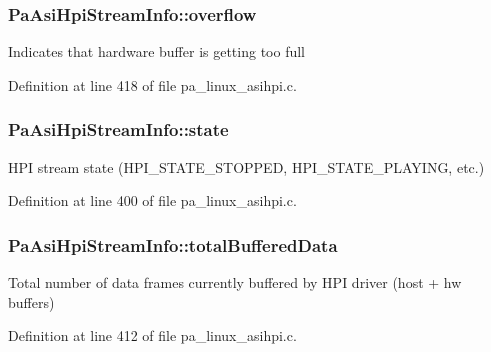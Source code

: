 \subsubsection[{\texorpdfstring{overflow}{overflow}}]{ Pa\+Asi\+Hpi\+Stream\+Info\+::overflow}\hypertarget{struct_pa_asi_hpi_stream_info_aab85a5b0d14b9f58ada42c0043a6f7f9}{}\label{struct_pa_asi_hpi_stream_info_aab85a5b0d14b9f58ada42c0043a6f7f9}
Indicates that hardware buffer is getting too full 

Definition at line 418 of file pa\+\_\+linux\+\_\+asihpi.\+c.

\subsubsection[{\texorpdfstring{state}{state}}]{ Pa\+Asi\+Hpi\+Stream\+Info\+::state}\hypertarget{struct_pa_asi_hpi_stream_info_ab9516c3e7be528304c1829cb086c0ba5}{}\label{struct_pa_asi_hpi_stream_info_ab9516c3e7be528304c1829cb086c0ba5}
H\+PI stream state (H\+P\+I\+\_\+\+S\+T\+A\+T\+E\+\_\+\+S\+T\+O\+P\+P\+ED, H\+P\+I\+\_\+\+S\+T\+A\+T\+E\+\_\+\+P\+L\+A\+Y\+I\+NG, etc.) 

Definition at line 400 of file pa\+\_\+linux\+\_\+asihpi.\+c.

\subsubsection[{\texorpdfstring{total\+Buffered\+Data}{totalBufferedData}}]{ Pa\+Asi\+Hpi\+Stream\+Info\+::total\+Buffered\+Data}\hypertarget{struct_pa_asi_hpi_stream_info_a573171e6d7e38fa204f0827638a09d1d}{}\label{struct_pa_asi_hpi_stream_info_a573171e6d7e38fa204f0827638a09d1d}
Total number of data frames currently buffered by H\+PI driver (host + hw buffers) 

Definition at line 412 of file pa\+\_\+linux\+\_\+asihpi.\+c.


